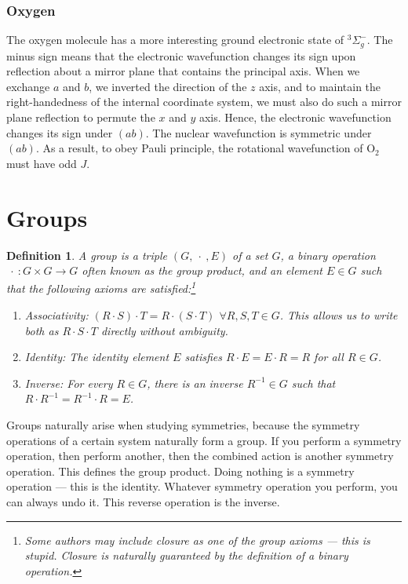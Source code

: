 \documentclass{article}
\theoremstyle{plain}\theoremheaderfont{\normalfont\itshape}\theorembodyfont{\rmfamily}\theoremseparator{.}\newtheorem*{rem}{Remark}\newtheorem*{ex}{Example}\newtheorem*{proof}{Proof}\newtheorem*{altp}{Alternative proof}
\theoremstyle{plain}\theoremheaderfont{\normalfont\bfseries}\theorembodyfont{\rmfamily}\theoremseparator{.}\newtheorem{thm}{Theorem}[section]\newtheorem{lem}[thm]{Lemma}\newtheorem{prop}[thm]{Proposition}\newtheorem*{cor}{Corollary}\newtheorem{defn}[thm]{Definition}\newtheorem{clm}[thm]{Claim}\newtheorem{clminproof}{Claim}\newtheorem*{law}{Law}\newtheorem{pos}[thm]{Postulate}
\theoremstyle{break}\theoremheaderfont{\normalfont\itshape}\theorembodyfont{\rmfamily}\theoremseparator{.\medskip}\newtheorem*{proofskip}{Proof}\newtheorem*{exs}{Examples}\newtheorem*{rems}{Remarks}
\theoremstyle{break}\theoremheaderfont{\normalfont\bfseries}\theorembodyfont{\rmfamily}\theoremseparator{.\medskip}\newtheorem{lemskip}[thm]{Lemma}\newtheorem{defnskip}[thm]{Definition}\newtheorem{propskip}[thm]{Proposition}\newtheorem{thmskip}[thm]{Theorem}
\numberwithin{equation}{section}
\begin{document}
    \subsubsection*{Oxygen}
    The oxygen molecule has a more interesting ground electronic state of \(^3\Sigma_g^-\). The minus sign means that the electronic wavefunction changes its sign upon reflection about a mirror plane that contains the principal axis. When we exchange \(a\) and \(b\), we inverted the direction of the \(z\) axis, and to maintain the right-handedness of the internal coordinate system, we must also do such a mirror plane reflection to permute the \(x\) and \(y\) axis. Hence, the electronic wavefunction changes its sign under \((ab)\). The nuclear wavefunction is symmetric under \((ab)\). As a result, to obey Pauli principle, the rotational wavefunction of \(\mathrm{O_2}\) must have odd \(J\).

    \newpage
    \section{Groups}
    \begin{defn}
        A \textit{group} is a triple \((G,\ \cdot\ ,E)\) of a set \(G\), a binary operation \(\ \cdot \ : G\times G\to G\) often known as the \textit{group product}, and an element \(E\in G\) such that the following axioms are satisfied:\footnote{Some authors may include \textit{closure} as one of the group axioms --- this is stupid. Closure is naturally guaranteed by the definition of a binary operation.}
        \begin{enumerate}[topsep=0pt]
            \item \textit{Associativity}: \((R\cdot S)\cdot T=R\cdot(S\cdot T)\) \(\forall R,S,T\in G\). This allows us to write both as \(R\cdot S\cdot T\) directly without ambiguity.
            \item \textit{Identity}: The \textit{identity element} \(E\) satisfies \(R\cdot E=E\cdot R=R\) for all \(R\in G\).
            \item \textit{Inverse}: For every \(R\in G\), there is an \textit{inverse} \(R^{-1}\in G\) such that \(R\cdot R^{-1}=R^{-1}\cdot R=E\).
        \end{enumerate}
    \end{defn}

    Groups naturally arise when studying symmetries, because the symmetry operations of a certain system naturally form a group. If you perform a symmetry operation, then perform another, then the combined action is another symmetry operation. This defines the group product. Doing nothing is a symmetry operation --- this is the identity. Whatever symmetry operation you perform, you can always undo it. This reverse operation is the inverse.
\end{document}
